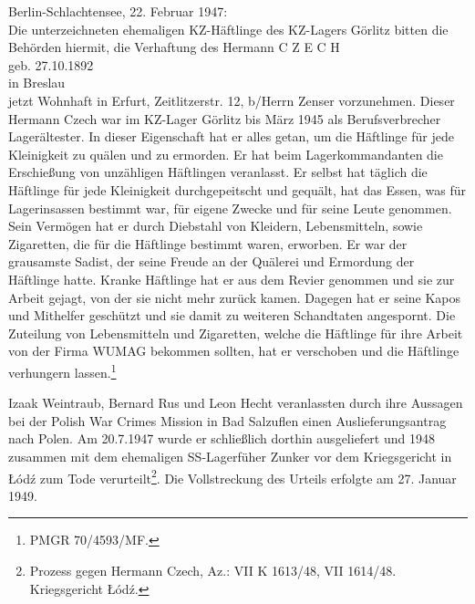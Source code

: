 \begin{leftbar}Berlin-Schlachtensee, 22. Februar 1947:\\ 
Die unterzeichneten ehemaligen KZ-Häftlinge des KZ-Lagers Görlitz bitten die Behörden hiermit, die Verhaftung des\newline
Hermann C Z E C H\\
geb. 27.10.1892\\ 
in Breslau\\
jetzt Wohnhaft in Erfurt, Zeitlitzerstr. 12, b/Herrn Zenser vorzunehmen.\newline
Dieser Hermann Czech war im KZ-Lager Görlitz bis März 1945 als Berufsverbrecher Lagerältester. In dieser Eigenschaft hat er alles getan, um die Häftlinge für jede Kleinigkeit zu quälen und zu ermorden. Er hat beim Lagerkommandanten die Erschießung von unzähligen Häftlingen veranlasst. Er selbst hat täglich die Häftlinge für jede Kleinigkeit durchgepeitscht und gequält, hat das Essen, was für Lagerinsassen bestimmt war, für eigene Zwecke und für seine Leute genommen. Sein Vermögen hat er durch Diebstahl von Kleidern, Lebensmitteln, sowie Zigaretten, die für die Häftlinge bestimmt waren, erworben. Er war der grausamste Sadist, der seine Freude an der Quälerei und Ermordung der Häftlinge hatte. Kranke Häftlinge hat er aus dem Revier genommen und sie zur Arbeit gejagt, von der sie nicht mehr zurück kamen. Dagegen hat er seine Kapos und Mithelfer geschützt und sie damit zu weiteren Schandtaten angespornt. Die Zuteilung von Lebensmitteln und Zigaretten, welche die Häftlinge für ihre Arbeit von der Firma WUMAG bekommen sollten, hat er verschoben und die Häftlinge verhungern lassen.\footnote{PMGR 70/4593/MF.}
\end{leftbar}
Izaak Weintraub, Bernard Rus und Leon Hecht veranlassten durch ihre Aussagen bei der Polish War Crimes Mission in Bad Salzuflen einen Auslieferungsantrag nach Polen. Am 20.7.1947 wurde er schließlich dorthin ausgeliefert und 1948 zusammen mit dem ehemaligen SS-Lagerfüher Zunker vor dem Kriegsgericht in \L \'od\'z zum Tode verurteilt\footnote{Prozess gegen Hermann Czech, Az.: VII K 1613/48, VII 1614/48. Kriegsgericht \L \'od\'z.}.
Die Vollstreckung des Urteils erfolgte am 27. Januar 1949.

